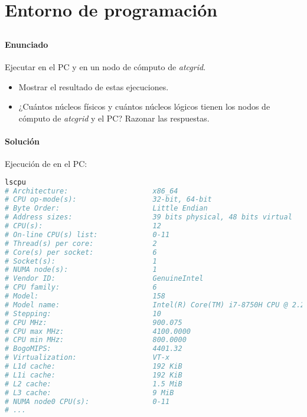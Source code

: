 \chapter{Entorno de programación}\label{entorno-de-programacion}

\section{}\label{ej1-1}

\subsubsection{Enunciado}

Ejecutar  en el PC y en un nodo de cómputo de \textit{atcgrid}.

\begin{itemize}
	\item Mostrar el resultado de estas ejecuciones.
	\item ¿Cuántos núcleos físicos y cuántos núcleos lógicos tienen los nodos de cómputo de \textit{atcgrid} y el PC\@? Razonar las respuestas.
\end{itemize}

\subsubsection{Solución}

Ejecución de  en el PC:

\begin{lstlisting}[language=sh]
lscpu
# Architecture:                    x86_64
# CPU op-mode(s):                  32-bit, 64-bit
# Byte Order:                      Little Endian
# Address sizes:                   39 bits physical, 48 bits virtual
# CPU(s):                          12
# On-line CPU(s) list:             0-11
# Thread(s) per core:              2
# Core(s) per socket:              6
# Socket(s):                       1
# NUMA node(s):                    1
# Vendor ID:                       GenuineIntel
# CPU family:                      6
# Model:                           158
# Model name:                      Intel(R) Core(TM) i7-8750H CPU @ 2.20GHz
# Stepping:                        10
# CPU MHz:                         900.075
# CPU max MHz:                     4100.0000
# CPU min MHz:                     800.0000
# BogoMIPS:                        4401.32
# Virtualization:                  VT-x
# L1d cache:                       192 KiB
# L1i cache:                       192 KiB
# L2 cache:                        1.5 MiB
# L3 cache:                        9 MiB
# NUMA node0 CPU(s):               0-11
# ...
\end{lstlisting}

